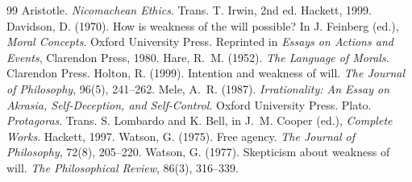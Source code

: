 \documentclass{situationist-preprint}
\begin{document}
\begin{thebibliography}{99}\small
{} Aristotle. \emph{Nicomachean Ethics}. Trans. T. Irwin, 2nd ed. Hackett, 1999.
 Davidson, D. (1970). How is weakness of the will possible? In J. Feinberg (ed.), \emph{Moral Concepts}. Oxford University Press. Reprinted in \emph{Essays on Actions and Events}, Clarendon Press, 1980.
 Hare, R.~M. (1952). \emph{The Language of Morals}. Clarendon Press.
 Holton, R. (1999). Intention and weakness of will. \emph{The Journal of Philosophy}, 96(5), 241--262.
 Mele, A.~R. (1987). \emph{Irrationality: An Essay on Akrasia, Self-Deception, and Self-Control}. Oxford University Press.
 Plato. \emph{Protagoras}. Trans. S. Lombardo and K. Bell, in J.~M. Cooper (ed.), \emph{Complete Works}. Hackett, 1997.
 Watson, G. (1975). Free agency. \emph{The Journal of Philosophy}, 72(8), 205--220.
 Watson, G. (1977). Skepticism about weakness of will. \emph{The Philosophical Review}, 86(3), 316--339.
\end{thebibliography}
\end{document}
